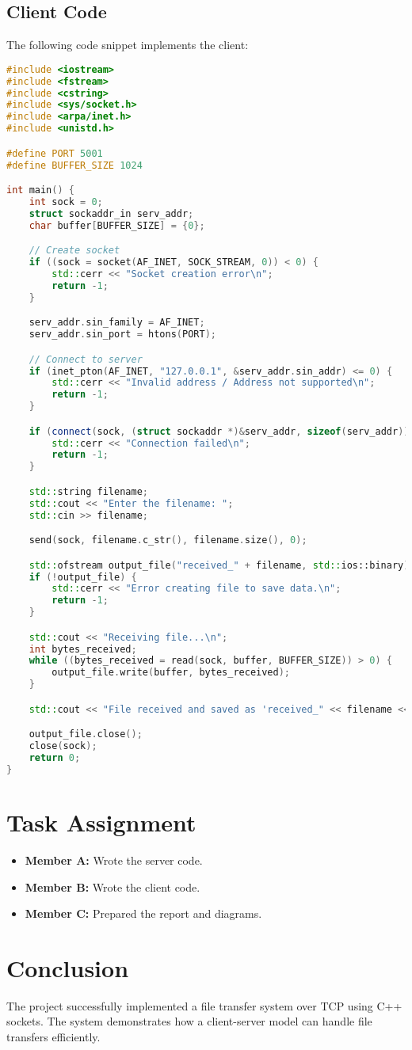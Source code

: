 \documentclass[a4paper,12pt]{article}
\begin{document}
\subsection{Client Code}
The following code snippet implements the client:
\begin{lstlisting}[language=C++,caption=Client Code]
#include <iostream>
#include <fstream>
#include <cstring>
#include <sys/socket.h>
#include <arpa/inet.h>
#include <unistd.h>

#define PORT 5001
#define BUFFER_SIZE 1024

int main() {
    int sock = 0;
    struct sockaddr_in serv_addr;
    char buffer[BUFFER_SIZE] = {0};

    // Create socket
    if ((sock = socket(AF_INET, SOCK_STREAM, 0)) < 0) {
        std::cerr << "Socket creation error\n";
        return -1;
    }

    serv_addr.sin_family = AF_INET;
    serv_addr.sin_port = htons(PORT);

    // Connect to server
    if (inet_pton(AF_INET, "127.0.0.1", &serv_addr.sin_addr) <= 0) {
        std::cerr << "Invalid address / Address not supported\n";
        return -1;
    }

    if (connect(sock, (struct sockaddr *)&serv_addr, sizeof(serv_addr)) < 0) {
        std::cerr << "Connection failed\n";
        return -1;
    }

    std::string filename;
    std::cout << "Enter the filename: ";
    std::cin >> filename;

    send(sock, filename.c_str(), filename.size(), 0);

    std::ofstream output_file("received_" + filename, std::ios::binary);
    if (!output_file) {
        std::cerr << "Error creating file to save data.\n";
        return -1;
    }

    std::cout << "Receiving file...\n";
    int bytes_received;
    while ((bytes_received = read(sock, buffer, BUFFER_SIZE)) > 0) {
        output_file.write(buffer, bytes_received);
    }

    std::cout << "File received and saved as 'received_" << filename << "'\n";

    output_file.close();
    close(sock);
    return 0;
}
\end{lstlisting}

\section{Task Assignment}
\begin{itemize}
    \item \textbf{Member A:} Wrote the server code.
    \item \textbf{Member B:} Wrote the client code.
    \item \textbf{Member C:} Prepared the report and diagrams.
\end{itemize}

\section{Conclusion}
The project successfully implemented a file transfer system over TCP using C++ sockets. The system demonstrates how a client-server model can handle file transfers efficiently.
\end{document}
